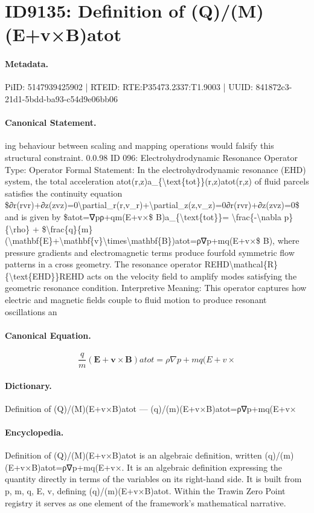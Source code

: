 \section*{ID9135: Definition of (Q)/(M)(E+v×B)atot}
\paragraph{Metadata.}
PiID: 5147939425902 | RTEID: RTE:P35473.2337:T1.9003 | UUID: 841872c3-21d1-5bdd-ba93-c54d9e06bb06

\paragraph{Canonical Statement.}
ing behaviour between scaling and mapping operations would falsify this structural constraint. 0.0.98 ID 096: Electrohydrodynamic Resonance Operator Type: Operator Formal Statement: In the electrohydrodynamic resonance (EHD) system, the total acceleration atot(r,z)a\_\{\textbackslash{}text\{tot\}\}(r,z)atot(r,z) of fluid parcels satisfies the continuity equation \$∂r(rvr)+∂z(zvz)=0\textbackslash{}partial\_r(r,v\_r)+\textbackslash{}partial\_z(z,v\_z)=0∂r(rvr)+∂z(zvz)=0\$ and is given by \$atot=∇pρ+qm(E+v×\$ B)a\_\{\textbackslash{}text\{tot\}\}= \textbackslash{}frac\{-\textbackslash{}nabla p\}\{\textbackslash{}rho\} + \$\textbackslash{}frac\{q\}\{m\}(\textbackslash{}mathbf\{E\}+\textbackslash{}mathbf\{v\}\textbackslash{}times\textbackslash{}mathbf\{B\})atot=ρ∇p+mq(E+v×\$ B), where pressure gradients and electromagnetic terms produce fourfold symmetric flow patterns in a cross geometry. The resonance operator REHD\textbackslash{}mathcal\{R\} \{\textbackslash{}text\{EHD\}\}REHD acts on the velocity field to amplify modes satisfying the geometric resonance condition. Interpretive Meaning: This operator captures how electric and magnetic fields couple to fluid motion to produce resonant oscillations an

\paragraph{Canonical Equation.}
\[
\frac{q}{m}(\mathbf{E}+\mathbf{v}\times\mathbf{B})atot=ρ∇p+mq(E+v×
\]

\paragraph{Dictionary.}
Definition of (Q)/(M)(E+v×B)atot — (q)/(m)(E+v×B)atot=ρ∇p+mq(E+v×

\paragraph{Encyclopedia.}
Definition of (Q)/(M)(E+v×B)atot is an algebraic definition, written (q)/(m)(E+v×B)atot=ρ∇p+mq(E+v×. It is an algebraic definition expressing the quantity directly in terms of the variables on its right-hand side. It is built from p, m, q, E, v, defining (q)/(m)(E+v×B)atot. Within the Trawin Zero Point registry it serves as one element of the framework's mathematical narrative.
